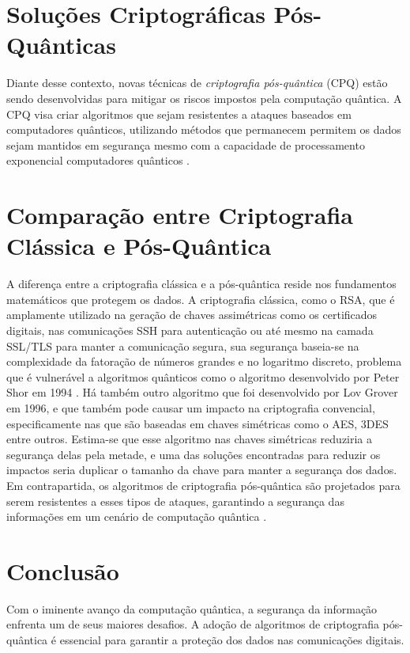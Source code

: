 \documentclass[12pt]{article}
\begin{document}
	\section{Soluções Criptográficas Pós-Quânticas}
	Diante desse contexto, novas técnicas de \textit{criptografia pós-quântica} (CPQ) estão sendo desenvolvidas para mitigar os riscos impostos pela computação quântica. A CPQ visa criar algoritmos que sejam resistentes a ataques baseados em computadores quânticos, utilizando métodos que permanecem permitem os dados sejam mantidos em segurança mesmo com a capacidade de processamento exponencial computadores quânticos \cite{nandhini2022extensive}.
	
	\section{Comparação entre Criptografia Clássica e Pós-Quântica}
	A diferença entre a criptografia clássica e a pós-quântica reside nos fundamentos matemáticos que protegem os dados. A criptografia clássica, como o RSA, que é amplamente utilizado na geração de chaves assimétricas como os certificados digitais, nas comunicações SSH para autenticação ou até mesmo na camada SSL/TLS para manter a comunicação segura, sua segurança baseia-se na complexidade da fatoração de números grandes e no logaritmo discreto, problema que é vulnerável a algoritmos quânticos como o algoritmo desenvolvido por Peter Shor em 1994 \cite{shor1994algorithms}. Há também outro algoritmo que foi desenvolvido por Lov Grover em 1996, e que também pode causar um impacto na criptografia convencial, especificamente nas que são baseadas em chaves simétricas como o AES, 3DES entre outros. Estima-se que esse algoritmo nas chaves simétricas reduziria a segurança delas pela metade, e uma das soluções encontradas para reduzir os impactos seria duplicar o tamanho da chave para manter a segurança dos dados\cite{grover1996fast}. Em contrapartida, os algoritmos de criptografia pós-quântica são projetados para serem resistentes a esses tipos de ataques, garantindo a segurança das informações em um cenário de computação quântica \cite{Callan2024}.
	
	\section{Conclusão}
	Com o iminente avanço da computação quântica, a segurança da informação enfrenta um de seus maiores desafios. A adoção de algoritmos de criptografia pós-quântica é essencial para garantir a proteção dos dados nas comunicações digitais.
	
	
	
\end{document}
